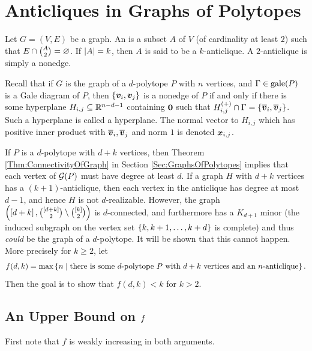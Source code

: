 \chapter{Anticliques in Graphs of Polytopes}
\label{chap:Anticliques}

Let \(G=(V, E)\) be a graph.  An  is a subset \(A\) of \(V\) (of cardinality at least \(2\)) such that \(E\cap\binom A2=\varnothing\).  If \(\left\lvert A\right\rvert=k\), then \(A\) is said to be a \(k\)-anticlique.  A \(2\)-anticlique is simply a nonedge.

Recall that if \(G\) is the graph of a \(d\)-polytope \(P\) with \(n\) vertices, and \(\Gamma\in\operatorname{gale}(P)\) is a Gale diagram of \(P\), then \(\left\{{\bm{v}}_i,{\bm{v}}_j\right\}\) is a nonedge of \(P\) if and only if there is some hyperplane \(H_{i,j}\subseteq\mathbb{R}^{n-d-1}\) containing \(\bm{0}\) such that \(H_{i,j}^{(+)}\cap\Gamma=\left\{\overline{\bm{v}}_i,\overline{\bm{v}}_j\right\}\).  Such a hyperplane is called a  hyperplane.  The normal vector to \(H_{i,j}\) which has positive inner product with \(\overline{\bm{v}}_i,\overline{\bm{v}}_j\) and norm \(1\) is denoted \(\bm{x}_{i,j}\).

If \(P\) is a \(d\)-polytope with \(d+k\) vertices, then Theorem \ref{Thm:ConnectivityOfGraph} in Section \ref{Sec:GraphsOfPolytopes} implies that each vertex of \(\mathcal{G}(P)\) must have degree at least \(d\).  If a graph \(H\) with \(d+k\) vertices has a \((k+1)\)-anticlique, then each vertex in the anticlique has degree at most \(d-1\), and hence \(H\) is not \(d\)-realizable.  However, the graph \(\left(\left[d+k\right],\binom{\left[d+k\right]}2\setminus\binom{\left[k\right]}2\right)\) is \(d\)-connected, and furthermore has a \(K_{d+1}\) minor (the induced subgraph on the vertex set \(\left\{k, k+1,\dotsc, k+d\right\}\) is complete) and thus \emph{could} be the graph of a \(d\)-polytope.  It will be shown that this cannot happen.  More precisely for \(k\ge 2\), let
    \[
        f(d,k)=\max\setb{n}{\text{there is some \(d\)-polytope \(P\) with \(d+k\) vertices and an \(n\)-anticlique}}.
    \]
Then the goal is to show that \(f(d,k)<k\) for \(k>2\).

\section{An Upper Bound on \protect$f\protect$}
First note that \(f\) is weakly increasing in both arguments.

